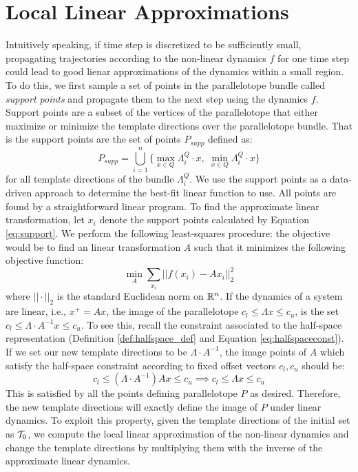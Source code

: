 \section{Local Linear Approximations}
\label{sec:lin_app}
%
Intuitively speaking, if time step is discretized to be sufficiently small, propagating trajectories according to the non-linear dynamics $f$ for one time step could lead to good lienar approximations of the dynamics within a small region.
%
%
To do this, we first sample a set of points in the parallelotope bundle called \emph{support points} and propagate them to the next step using the dynamics $f$.
%
Support points are a subset of the vertices of the parallelotope that either maximize or minimize the template directions over the parallelotope bundle.
%
That is the support points are the set of points $P_{supp}$ defined as:
\begin{equation}
\label{eq:support}
 P_{supp} = \bigcup_{i=1}^n \{ \max_{x \in Q} \Lambda^Q_i\cdot x, \; \min_{x \in Q} \Lambda^Q_i\cdot x \}
\end{equation}
%
for all template directions of the bundle $\Lambda^Q_i$. We use the support points as a data-driven approach to determine the best-fit linear function to use. All points are found by a straightforward linear program.
%
%
To find the approximate linear transformation, let $x_i$ denote the support points calculated by Equation \ref{eq:support}. We perform the following least-squares procedure: the objective would be to find an linear transformation $A$ such that it minimizes the following objective function:
\begin{equation}
  \label{eq:least_squares}
  \min_{A} \sum_{x_i} ||f(x_i) - Ax_i||^2_2
\end{equation}
%
where $||\cdot||_2$ is the standard Euclidean norm on ${\mathbb{R}}^n$.
%
If the dynamics of a system are linear, i.e., $x^{+} = Ax$, the image of the parallelotope $c_{l} \leq \Lambda x \leq c_{u}$, is the set $c_{l} \leq \Lambda \cdot A^{-1} x \leq c_{u}$.
%
To see this, recall the constraint associated to the half-space representation (Definition \ref{def:halfspace_def} and Equation \ref{eq:halfspaceconst}). If we set our new template directions to be $\Lambda \cdot A^{-1}$, the image points of $A$ which satisfy the half-space constraint according to fixed offset vectors $c_l, c_u$ should be:
 \[ c_l \leq (\Lambda \cdot A^{-1})Ax \leq c_u \implies c_{l} \leq \Lambda x \leq c_{u} \]
%
This is satisfied by all the points defining parallelotope $P$ as desired. Therefore, the new template directions will exactly define the image of $P$ under linear dynamics. To exploit this property, given the template directions of the initial set as $\mathcal{T}_0$, we compute the local linear approximation of the non-linear dynamics and change the template directions by multiplying them with the inverse of the approximate linear dynamics.
%
%

